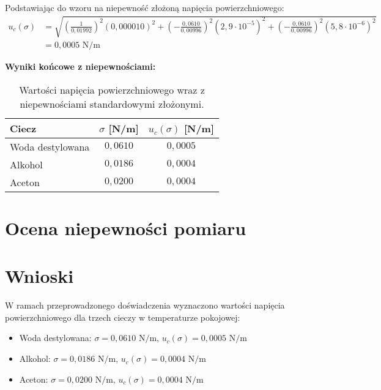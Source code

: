 \documentclass[a4paper,12pt]{article}
\begin{document}
Podstawiając do wzoru na niepewność złożoną napięcia powierzchniowego:
\begin{align*}
    u_c(\sigma) & = \sqrt{\left(\frac{1}{0{,}01992}\right)^2 (0{,}000010)^2 + \left(-\frac{0{,}0610}{0{,}00996}\right)^2 (2{,}9 \cdot 10^{-5})^2 + \left(-\frac{0{,}0610}{0{,}00996}\right)^2 (5{,}8 \cdot 10^{-6})^2} \\
                & = 0{,}0005 \text{ N/m}
\end{align*}

\noindent\textbf{Wyniki końcowe z niepewnościami:}

\begin{table}[H]
    \centering
    \begin{tabular}{|l|c|c|}
        \hline
        \textbf{Ciecz} & \textbf{$\sigma$ [N/m]} & \textbf{$u_c(\sigma)$ [N/m]} \\
        \hline
        Woda destylowana & $0{,}0610$ & $0{,}0005$ \\
        \hline
        Alkohol & $0{,}0186$ & $0{,}0004$ \\
        \hline
        Aceton & $0{,}0200$ & $0{,}0004$ \\
        \hline
    \end{tabular}
    \caption{Wartości napięcia powierzchniowego wraz z niepewnościami standardowymi złożonymi.}
    \label{tab:wyniki_z_niepewnosciami}
\end{table}

\section{Ocena niepewności pomiaru}

\section{Wnioski}

W ramach przeprowadzonego doświadczenia wyznaczono wartości napięcia powierzchniowego dla trzech cieczy w temperaturze pokojowej:

\begin{itemize}
    \item Woda destylowana: $\sigma = 0{,}0610 \text{ N/m}$, $u_c(\sigma) = 0{,}0005 \text{ N/m}$
    \item Alkohol: $\sigma = 0{,}0186 \text{ N/m}$, $u_c(\sigma) = 0{,}0004 \text{ N/m}$
    \item Aceton: $\sigma = 0{,}0200 \text{ N/m}$, $u_c(\sigma) = 0{,}0004 \text{ N/m}$
\end{itemize}
\end{document}
